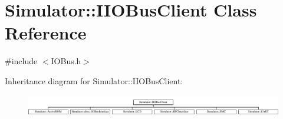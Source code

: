 \hypertarget{class_simulator_1_1_i_i_o_bus_client}{\section{Simulator\+:\+:I\+I\+O\+Bus\+Client Class Reference}
\label{class_simulator_1_1_i_i_o_bus_client}
}


{\ttfamily \#include $<$I\+O\+Bus.\+h$>$}

Inheritance diagram for Simulator\+:\+:I\+I\+O\+Bus\+Client\+:\begin{figure}[H]
\begin{center}
\leavevmode
\includegraphics[height=0.952381cm]{class_simulator_1_1_i_i_o_bus_client}
\end{center}
\end{figure}
